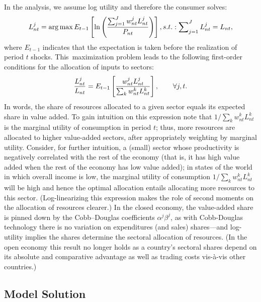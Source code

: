\documentclass[12pt]{article}
\begin{document}
In the analysis, we assume log utility and therefore the consumer solves: 
\begin{equation}
L_{nt}^{j}=\arg \max E_{t-1}\left[ \ln \left( \frac{%
\sum_{j=1}^{J}w_{nt}^{j}L_{nt}^{j}}{P_{nt}}\right) \right]
,s.t.:\sum\nolimits_{j=1}^{J}L_{nt}^{j}=L_{nt},  \label{eq:log:utility}
\end{equation}%
where $E_{t-1}$ indicates that the expectation is taken before the
realization of period $t$ shocks. This\ maximization problem leads to the
following first-order conditions for the allocation of inputs to sectors: 
\begin{equation}
\frac{L_{nt}^{j}}{L_{nt}}=E_{t-1}\left[ \frac{w_{nt}^{j}L_{nt}^{j}}{%
\sum_{k}w_{nt}^{k}L_{nt}^{k}}\right] ,\qquad \forall j,t.  \label{eq:FOC}
\end{equation}%
In words, the share of resources allocated to a given sector equals its
expected share in value added. To gain intuition on this expression note
that $1/\sum_{k}w_{nt}^{k}L_{nt}^{k}$ is the marginal utility of consumption
in period $t$; thus, more resources are allocated to higher value-added
sectors, after appropriately weighting by marginal utility. Consider, for
further intuition, a (small) sector whose productivity is negatively
correlated with the rest of the economy (that is, it has high value added
when the rest of the economy has low value added); in states of the world in
which overall income is low, the marginal utility of consumption $%
1/\sum_{k}w_{nt}^{k}L_{nt}^{k}$ will be high and hence the optimal
allocation entails allocating more resources to this sector.
(Log-linearizing this expression makes the role of second moments on the
allocation of resources clearer.) In the closed economy, the value-added
share is pinned down by the Cobb--Douglas coefficients $\alpha ^{j}\beta
^{j} $, as with Cobb-Douglas technology there is no variation on
expenditures (and sales) shares---and log-utility implies the shares
determine the sectoral allocation of resources. (In the open economy this
result no longer holds as a country's sectoral shares depend on its absolute
and comparative advantage as well as trading costs vis-\`{a}-vis other
countries.)

\subsection{Model Solution}
\end{document}
